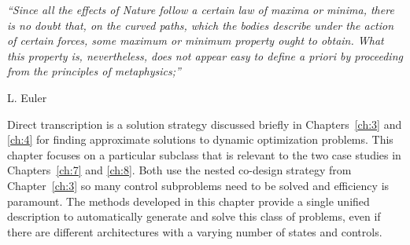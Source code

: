 

\epigraph{\textit{``Since all the effects of Nature follow a certain law of maxima or minima, there is no doubt that, on the curved paths, which the bodies describe under the action of certain forces, some maximum or minimum property ought to obtain. What this property is, nevertheless, does not appear easy to define \textit{a priori} by proceeding from the principles of metaphysics;''}}{\textmd{L. Euler} \cite[p.~106]{Goldstine1980a}}

Direct transcription is a solution strategy discussed briefly in Chapters~\ref{ch:3} and \ref{ch:4} for finding approximate solutions to dynamic optimization problems.
This chapter focuses on a particular subclass that is relevant to the two case studies in Chapters~\ref{ch:7} and \ref{ch:8}.
Both use the nested co-design strategy from Chapter~\ref{ch:3} so many control subproblems need to be solved and efficiency is paramount.
The methods developed in this chapter provide a single unified description to automatically generate and solve this class of problems, even if there are different architectures with a varying number of states and controls.















